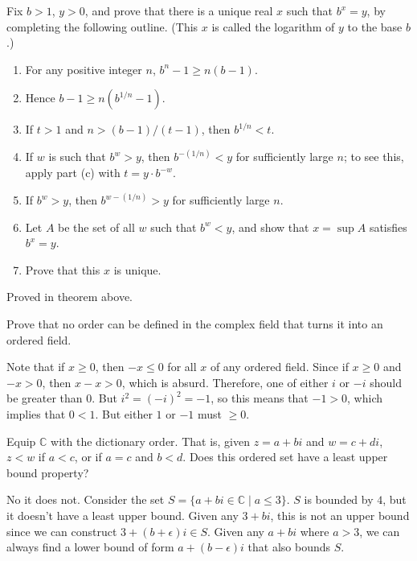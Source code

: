   \begin{exercise}[Rudin 1.7]
    Fix $b > 1$, $y > 0$, and prove that there is a unique real $x$ such that $b^x = y$, by
    completing the following outline. (This $x$ is called the logarithm of $y$ to the base $b$.)
    \begin{enumerate}
      \item For any positive integer $n$, $b^n - 1 \geq n(b-1)$.
      \item Hence $b - 1 \geq n(b^{1/n} - 1)$.
      \item If $t > 1$ and $n > (b-1)/(t-1)$, then $b^{1/n} < t$.
      \item If $w$ is such that $b^w > y$, then $b^{-(1/n)} < y$ for sufficiently large $n$; to see this,
        apply part (c) with $t = y \cdot b^{-w}$.
      \item If $b^w > y$, then $b^{w-(1/n)} > y$ for sufficiently large $n$.
      \item Let $A$ be the set of all $w$ such that $b^w < y$, and show that $x = \sup A$ satisfies
        $b^x = y$.
      \item Prove that this $x$ is unique.
    \end{enumerate}
  \end{exercise}
  \begin{solution}
    Proved in theorem above. 
  \end{solution}

  \begin{exercise}[Rudin 1.8]
    Prove that no order can be defined in the complex field that turns it into an ordered field. 
  \end{exercise}
  \begin{solution}
    Note that if $x \geq 0$, then $-x \leq 0$ for all $x$ of any ordered field. Since if $x \geq 0$ and $-x > 0$, then $x -x > 0$, which is absurd. Therefore, one of either $i$ or $-i$ should be greater than $0$. But $i^2 = (-i)^2 = -1$, so this means that $-1 > 0$, which implies that $0 < 1$. But either $1$ or $-1$ must $\geq 0$. 
  \end{solution}

  \begin{exercise}[Rudin 1.9]
    Equip $\mathbb{C}$ with the dictionary order. That is, given $z = a + bi$ and $w = c + di$, $z < w$ if $a < c$, or if $a = c$ and $b < d$. Does this ordered set have a least upper bound property? 
  \end{exercise}
  \begin{solution}
    No it does not. Consider the set $S = \{ a + b i \in \mathbb{C} \mid a \leq 3\}$. $S$ is bounded by $4$, but it doesn't have a least upper bound. Given any $3 + bi$, this is not an upper bound since we can construct $3 + (b + \epsilon) i \in S$. Given any $a + bi$ where $a > 3$, we can always find a lower bound of form $a + (b - \epsilon) i$ that also bounds $S$. 
  \end{solution}

